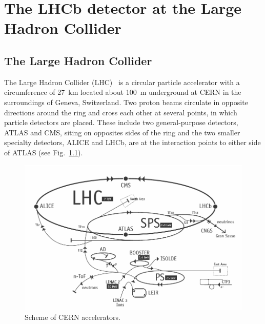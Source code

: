 \chapter{The LHCb detector at the Large Hadron Collider}
\label{ch:detector}

\section{The Large Hadron Collider}

The Large Hadron Collider (LHC)~\cite{Evans:2009zzc} is a circular particle accelerator with a circumference 
of 27~km located about 100~m underground at CERN in the surroundings of Geneva, Switzerland. 
Two proton beams circulate in opposite directions around the ring and cross each
other at several points, in which particle detectors are placed. These include two general-purpose detectors, 
ATLAS and CMS, siting on opposites sides of the ring and the two smaller specialty detectors, 
ALICE and LHCb, are at the interaction points to either side of ATLAS (see Fig.~\ref{fig:lhc}).

\begin{figure}[h!]
\centering
\includegraphics[width=1\textwidth]{Detector/figs/LHC_scheme.png}
\caption{Scheme of CERN accelerators.} 
\label{fig:lhc}
\end{figure}

